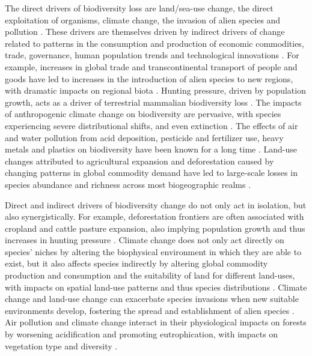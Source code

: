 \documentclass[titlesmallcaps,copyrightpage]{uomthesis}\usepackage[]{graphicx}\usepackage[]{color}
\begin{document}
The direct drivers of biodiversity loss are land/sea-use change, the direct exploitation of organisms, climate change, the invasion of alien species and pollution \citep{ipbes_summary_2019}. These drivers are themselves driven by indirect drivers of change related to patterns in the consumption and production of economic commodities, trade, governance, human population trends and technological innovations \citep{ipbes_summary_2019}. For example, increases in global trade and transcontinental transport of people and goods have led to increases in the introduction of alien species to new regions, with dramatic impacts on regional biota \citep{mooney_evolutionary_2001, foley_global_2005}. Hunting pressure, driven by population growth, acts as a driver of terrestrial mammalian biodiversity loss \citep{romeromunoz_habitat_2021}. The impacts of anthropogenic climate change on biodiversity are pervasive, with species experiencing severe distributional shifts, and even extinction \citep{ipbes_summary_2019, struebig_targeted_2015}. The effects of air and water pollution from acid deposition, pesticide and fertilizer use, heavy metals and plastics on biodiversity have been known for a long time \citep{mcneely_sinking_1992}. Land-use changes attributed to agricultural expansion and deforestation caused by changing patterns in global commodity demand have led to large-scale losses in species abundance and richness across most biogeographic realms \citep{newbold_global_2015}.

Direct and indirect drivers of biodiversity change do not only act in isolation, but also synergistically. For example, deforestation frontiers are often associated with cropland and cattle pasture expansion, also implying population growth and thus increases in hunting pressure \citep{romeromunoz_habitat_2021}. Climate change does not only act directly on species' niches by altering the biophysical environment in which they are able to exist, but it also affects species indirectly by altering global commodity production and consumption and the suitability of land for different land-uses, with impacts on spatial land-use patterns and thus species distributions \citep{kapitza_assessing_2021}. Climate change and land-use change can exacerbate species invasions when new suitable environments develop, fostering the spread and establishment of alien species \citep{bellard_will_2013}. Air pollution and climate change interact in their physiological impacts on forests by worsening acidification and promoting eutrophication, with impacts on vegetation type and diversity \citep{bytnerowicz_integrated_2007}.
\end{document}
